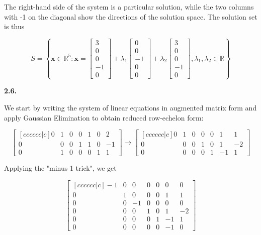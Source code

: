 \documentclass{article}
\def\R{{\mathbb{R}}}
\newcommand{\matr}[1]{\bm{#1}}
\begin{document}
The right-hand side of the system is a particular solution, while the two columns with -1 on the diagonal show the directions of the solution space. The solution set is thus

\[
S = \left\{\matr{x} \in \R^5: \matr{x} = \begin{bmatrix}
    3\\0\\0\\-1\\0
\end{bmatrix} + \lambda_1\begin{bmatrix}
    0\\0\\-1\\0\\0
\end{bmatrix} + \lambda_2\begin{bmatrix}
    3\\0\\0\\-1\\0
\end{bmatrix}, \lambda_1, \lambda_2 \in \R\right\}
\]

\textbf{2.6.}

We start by writing the system of linear equations in augmented matrix form and apply Gaussian Elimination to obtain reduced row-echelon form:

\[
\begin{bmatrix}[c c c c c c | c]
    0 & 1 & 0 & 0 & 1 & 0 & 2\\
    0 & 0 & 0 & 1 & 1 & 0 & -1\\
    0 & 1 & 0 & 0 & 0 & 1 & 1
\end{bmatrix} \rightarrow
\begin{bmatrix}[c c c c c c | c]
    0 & 1 & 0 & 0 & 0 & 1 & 1\\
    0 & 0 & 0 & 1 & 0 & 1 & -2\\
    0 & 0 & 0 & 0 & 1 & -1 & 1
\end{bmatrix}
\]

Applying the "minus 1 trick", we get

\[
\begin{bmatrix}[c c c c c c | c]
    -1 & 0 & 0 & 0 & 0 & 0 & 0\\
    0 & 1 & 0 & 0 & 0 & 1 & 1\\
    0 & 0 & -1 & 0 & 0 & 0 & 0\\
    0 & 0 & 0 & 1 & 0 & 1 & -2\\
    0 & 0 & 0 & 0 & 1 & -1 & 1\\
    0 & 0 & 0 & 0 & 0 & -1 & 0
\end{bmatrix}
\]
\end{document}
